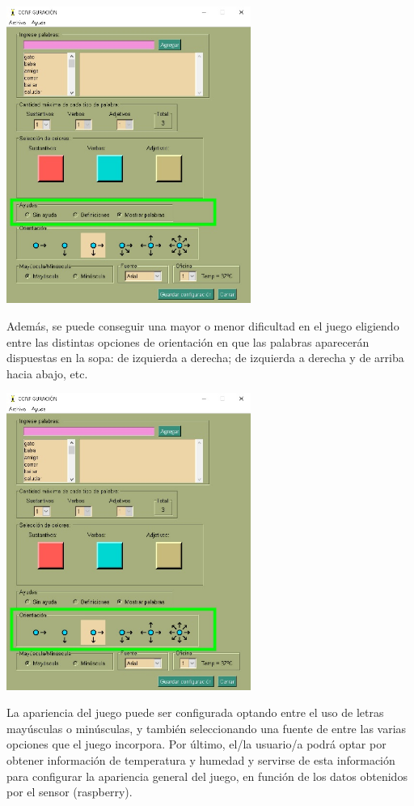 \includegraphics[width=0.6\textwidth,keepaspectratio]{img/guia/8.jpg}
	
Además, se puede conseguir una mayor o menor dificultad en el juego eligiendo entre las distintas opciones de orientación en que las palabras aparecerán dispuestas en la sopa: de izquierda a derecha; de izquierda a derecha y de arriba hacia abajo, etc.

\includegraphics[width=0.6\textwidth,keepaspectratio]{img/guia/9.jpg}

La apariencia del juego puede ser configurada optando entre el uso de letras mayúsculas o minúsculas, y también seleccionando una fuente de entre las varias opciones que el juego incorpora. Por último, el/la usuario/a podrá optar por obtener información de temperatura y humedad y servirse de esta información para configurar la apariencia general del juego, en función de los datos obtenidos por el sensor (raspberry).

